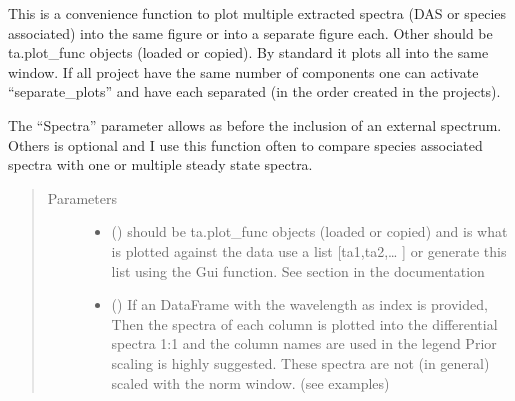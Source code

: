 \documentclass[letterpaper,10pt,english]{sphinxmanual}
\begin{document}
\begin{fulllineitems}

\begin{fulllineitems}
\label{\detokenize{plot_func:plot_func.TA.Compare_DAC}}
This is a convenience function to plot multiple extracted spectra
(DAS or species associated) into the same figure or into a separate figure
each. Other should be ta.plot\_func objects (loaded or copied). By
standard it plots all into the same window. If all project have the same
number of components one can activate “separate\_plots” and have each
separated (in the order created in the projects).

The “Spectra” parameter allows as before the inclusion of an external
spectrum. Others is optional and I use this function often to compare
species associated spectra with one or multiple steady state spectra.
\begin{quote}\begin{description}
\item[{Parameters}] \leavevmode\begin{itemize}
\item {} 
 (\sphinxstyleliteralemphasis{\sphinxupquote{, }}) \textendash{} should be ta.plot\_func objects (loaded or copied) and is what
is plotted against the data use a list {[}ta1,ta2,… {]} or generate this
list using the Gui function. See section {\hyperref[\detokenize{Opening:opening-multiple-files}]{}} in
the documentation

\item {} 
 (\sphinxstyleliteralemphasis{\sphinxupquote{, }}) \textendash{} If an DataFrame with the wavelength as index is provided, Then the spectra of each column
is plotted into the differential spectra 1:1 and the column names are used in the legend
Prior scaling is highly suggested. These spectra are not (in general) scaled with the
norm window. (see examples)


\end{itemize}
\end{description}
\end{quote}
\end{fulllineitems}
\end{fulllineitems}
\end{document}
